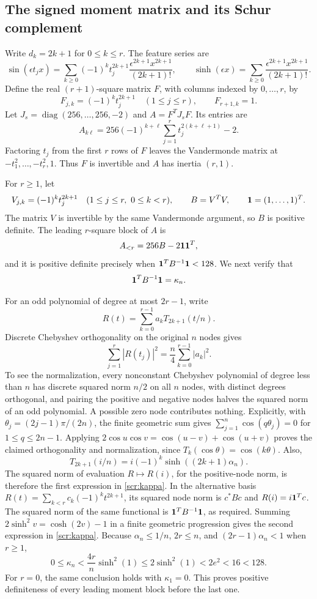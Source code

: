 \subsection{The signed moment matrix and its Schur complement}

Write \(d_k=2k+1\) for \(0\le k\le r\). The feature series are
\[
 \sin(\epsilon t_jx)
  =\sum_{k\ge0}(-1)^kt_j^{2k+1}
             \frac{\epsilon^{2k+1}x^{2k+1}}{(2k+1)!},
 \qquad
 \sinh(\epsilon x)
  =\sum_{k\ge0}
             \frac{\epsilon^{2k+1}x^{2k+1}}{(2k+1)!}.
\]
Define the real \((r+1)\)-square matrix \(F\), with columns
indexed by \(0,\ldots,r\), by
\[
 F_{j,k}=(-1)^kt_j^{2k+1}\quad(1\le j\le r),\qquad
 F_{r+1,k}=1.
\]
Let \(J_s=\operatorname{diag}(256,\ldots,256,-2)\) and
\(A=F^TJ_sF\). Its entries are
\begin{equation}\label{scr:moment-matrix}
 A_{k\ell}
  =256(-1)^{k+\ell}\sum_{j=1}^r t_j^{2(k+\ell+1)}-2.
\end{equation}
Factoring \(t_j\) from the first \(r\) rows of \(F\) leaves
the Vandermonde matrix at \(-t_1^2,\ldots,-t_r^2,1\).
Thus \(F\) is invertible and \(A\) has inertia \((r,1)\).

For \(r\ge1\), let
\[
 V_{j,k}=(-1)^kt_j^{2k+1}
       \quad(1\le j\le r,\ 0\le k<r),\qquad
 B=V^TV,\qquad {\bf1}=(1,\ldots,1)^T.
\]
The matrix \(V\) is invertible by the same Vandermonde argument,
so \(B\) is positive definite. The leading \(r\)-square block
of \(A\) is
\[
 A_{<r}=256B-2{\bf1}{\bf1}^T,
\]
and it is positive definite precisely when
\({\bf1}^TB^{-1}{\bf1}<128\). We next verify that
\[
 {\bf1}^TB^{-1}{\bf1}=\kappa_n.
\]

For an odd polynomial of degree at most \(2r-1\), write
\[
 R(t)=\sum_{k=0}^{r-1}a_kT_{2k+1}(t/n).
\]
Discrete Chebyshev orthogonality on the original \(n\) nodes
gives
\[
 \sum_{j=1}^r|R(t_j)|^2=\frac n4\sum_{k=0}^{r-1}|a_k|^2.
\]
To see the normalization, every nonconstant Chebyshev polynomial
of degree less than \(n\) has discrete squared norm \(n/2\)
on all \(n\) nodes, with distinct degrees orthogonal, and pairing
the positive and negative nodes halves the squared norm of an odd
polynomial. A possible zero node contributes nothing.
Explicitly, with \(\theta_j=(2j-1)\pi/(2n)\), the finite geometric
sum gives \(\sum_{j=1}^n\cos(q\theta_j)=0\) for
\(1\le q\le2n-1\). Applying
\(2\cos u\cos v=\cos(u-v)+\cos(u+v)\) proves the claimed
orthogonality and normalization, since \(T_k(\cos\theta)=\cos(k\theta)\).
Also,
\[
 T_{2k+1}(i/n)=i(-1)^k\sinh((2k+1)\alpha_n).
\]
The squared norm of evaluation \(R\mapsto R(i)\), for the
positive-node norm, is therefore the first expression in
\eqref{scr:kappa}. In the alternative basis
\(R(t)=\sum_{k<r}c_k(-1)^kt^{2k+1}\), its squared node norm
is \(c^*Bc\) and \(R(i)=i{\bf1}^Tc\). The squared norm of the
same functional is \({\bf1}^TB^{-1}{\bf1}\), as required.
Summing \(2\sinh^2 v=\cosh(2v)-1\) in a finite geometric
progression gives the second expression in \eqref{scr:kappa}.
Because \(\alpha_n\le1/n\), \(2r\le n\), and
\((2r-1)\alpha_n<1\) when \(r\ge1\),
\[
 0\le\kappa_n<\frac{4r}{n}\sinh^2(1)
       \le2\sinh^2(1)<2e^2<16<128.
\]
For \(r=0\), the same conclusion holds with \(\kappa_1=0\).
This proves positive definiteness of every leading moment block
before the last one.

